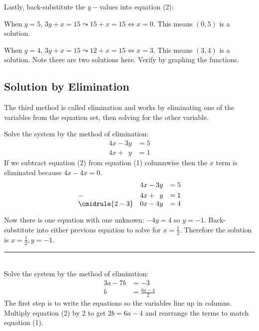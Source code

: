 Lastly, back-substitute the $y-$values into equation (2): 
 
 When $y =5$, $3 y +x =15 \leadsto 15 +x =15 \Longleftrightarrow x =0$. This means $\left (0 ,5\right )$ is a solution. 
 
 When $y =4$, $3 y +x =15 \leadsto 12 +x =15 \Longleftrightarrow x =3$. This means $\left (3 ,4\right )$ is a solution. 
 Note there are two solutions here. Verify by graphing the functions.
\subsection*{Solution by Elimination} 
The third method is called elimination and works by eliminating one of the variables from the equation set, then solving for the other variable.

\example Solve the system by the method of elimination:
\begin{align*}
4x-3y&=5\tag{1}\\
4x+\phantom{1}y&=1\tag{2}
\end{align*}
\solution If we subtract equation (2) from equation (1) columnwise then the $x$ term is eliminated because $4x-4x=0$.
\[\begin{array}{lrl}
  			 &4x-3y	         &=5 \\[\jot]
 -\phantom{1}&4x+\phantom{1}y&=1 \\
\cmidrule{2-3}
 & 0x-4y &=4  \\[\jot]
\end{array}\]
Now there is one equation with one unknown: $-4y=4$ so $y=-1$. Back-substitute into either previous equation to solve for $x=\frac{1}{2}$. Therefore the solution is $x=\frac{1}{2},y=-1$.\\
\rule{6.8cm}{0.5pt}\\
\example Solve the system by the method of elimination:
\begin{align*}
3a-7b&=-3\tag{1}\\
b&=\frac{6a-4}{2}\tag{2}
\end{align*}
\solution The first step is to write the equations so the variables line up in columns. Multiply equation (2) by 2 to get $2b=6a-4$ and rearrange the terms to match equation (1). 

